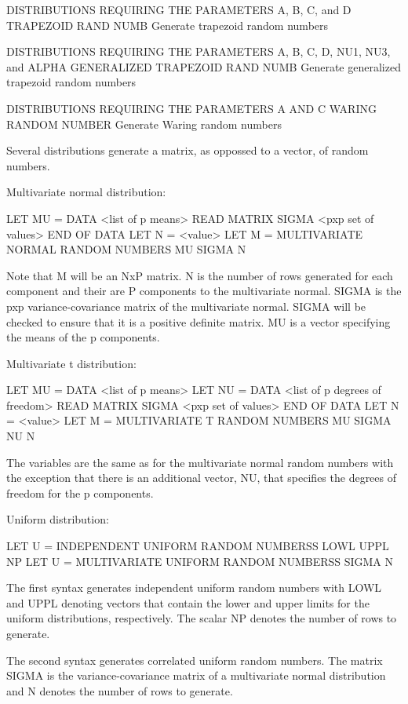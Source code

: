 DISTRIBUTIONS REQUIRING THE PARAMETERS A, B, C, and D
   TRAPEZOID RAND NUMB             Generate trapezoid random numbers

DISTRIBUTIONS REQUIRING THE PARAMETERS A, B, C, D, NU1, NU3, and ALPHA
   GENERALIZED TRAPEZOID RAND NUMB Generate generalized trapezoid
                                   random numbers

DISTRIBUTIONS REQUIRING THE PARAMETERS A AND C
   WARING RANDOM NUMBER            Generate Waring random numbers

Several distributions generate a matrix, as oppossed to a vector,
of random numbers.

Multivariate normal distribution:

   LET MU = DATA <list of p means>
   READ MATRIX SIGMA
      <pxp set of values>
   END OF DATA
   LET N = <value>
   LET M = MULTIVARIATE NORMAL RANDOM NUMBERS MU SIGMA N

   Note that M will be an NxP matrix.  N is the number of rows
   generated for each component and their are P components to
   the multivariate normal.  SIGMA is the pxp variance-covariance
   matrix of the multivariate normal.  SIGMA will be checked to
   ensure that it is a positive definite matrix.  MU is a vector
   specifying the means of the p components.

Multivariate t distribution:

   LET MU = DATA <list of p means>
   LET NU = DATA <list of p degrees of freedom>
   READ MATRIX SIGMA
      <pxp set of values>
   END OF DATA
   LET N = <value>
   LET M = MULTIVARIATE T RANDOM NUMBERS MU SIGMA NU N

   The variables are the same as for the multivariate normal random
   numbers with the exception that there is an additional vector,
   NU, that specifies the degrees of freedom for the p components.

Uniform distribution:

   LET U = INDEPENDENT UNIFORM RANDOM NUMBERSS LOWL UPPL NP
   LET U = MULTIVARIATE UNIFORM RANDOM NUMBERSS SIGMA N

   The first syntax generates independent uniform random numbers
   with LOWL and UPPL denoting vectors that contain the lower and
   upper limits for the uniform distributions, respectively.  The
   scalar NP denotes the number of rows to generate.

   The second syntax generates correlated uniform random numbers.
   The matrix SIGMA is the variance-covariance matrix of a
   multivariate normal distribution and N denotes the number of
   rows to generate.

